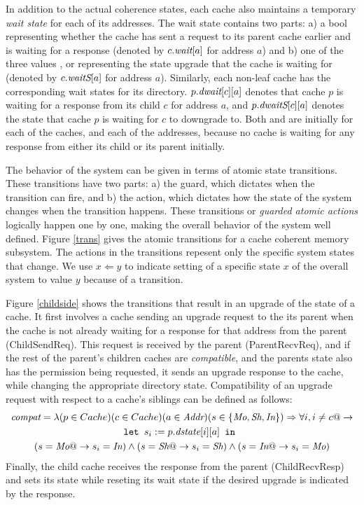 In addition to the actual coherence states, each cache also maintains a
temporary \emph{wait state} for each of its addresses. The wait state contains
two parts: a) a bool representing whether the cache has sent a request to its
parent cache earlier and is waiting for a response (denoted by $c.\textit{wait}[a]$ for
address $a$) and b) one of the three values \Mo, \Sh{} or \In representing the
state upgrade that the cache is waiting for (denoted by $c.\textit{waitS}[a]$ for
address $a$). Similarly, each non-leaf cache has the corresponding wait states
for its directory.  $p.\textit{dwait}[c][a]$ denotes that cache $p$ is waiting for a
response from its child $c$ for address $a$, and $p.\textit{dwaitS}[c][a]$ denotes the
state that cache $p$ is waiting for $c$ to downgrade to. Both \wait{} and
\dwait{} are \False{} initially for each of the caches, and each of the
addresses, because no cache is waiting for any response from either its child
or its parent initially.

The behavior of the system can be given in terms of atomic state transitions.
These transitions have two parts: a) the guard, which dictates when the
transition can fire, and b) the action, which dictates how the state of the
system changes when the transition happens. These transitions or \emph{guarded
atomic actions} logically happen one by one, making the overall behavior of the
system well defined. Figure \ref{trans} gives the atomic transitions for a
cache coherent memory subsystem. The actions in the transitions repesent only
the specific system states that change. We use $x \Leftarrow y$ to indicate
setting of a specific state $x$ of the overall system to value $y$ because of a
transition.

Figure \ref{childside} shows the transitions that result in an upgrade of the
state of a cache. It first involves a cache sending an upgrade request to the
its parent when the cache is not already waiting for a response for that
address from the parent (ChildSendReq). This request is received by the parent
(ParentRecvReq), and if the rest of the parent's children caches are
\emph{compatible}, and the parents state also has the permission being
requested, it sends an upgrade response to the cache, while changing the
appropriate directory state. Compatibility of an upgrade request with respect
to a cache's siblings can be defined as follows:
\begin{multline*}
\textit{compat} = \lambda (p \in Cache) (c \in Cache) (a \in \textit{Addr}) (s \in \{\textit{Mo}, \textit{Sh}, \textit{In}\}) \Rightarrow \forall i, i \ne c @-> \\
\texttt{let } s_i := p.\textit{dstate}[i][a] \texttt{ in }\\
 (s = \textit{Mo} @-> s_i = \textit{In}) \wedge (s = \textit{Sh} @-> s_i = \textit{Sh}) \wedge (s = \textit{In} @-> s_i = \textit{Mo})
\end{multline*}
Finally, the child cache receives the response from the parent (ChildRecvResp)
and sets its state while reseting its wait state if the desired upgrade is
indicated by the response.

